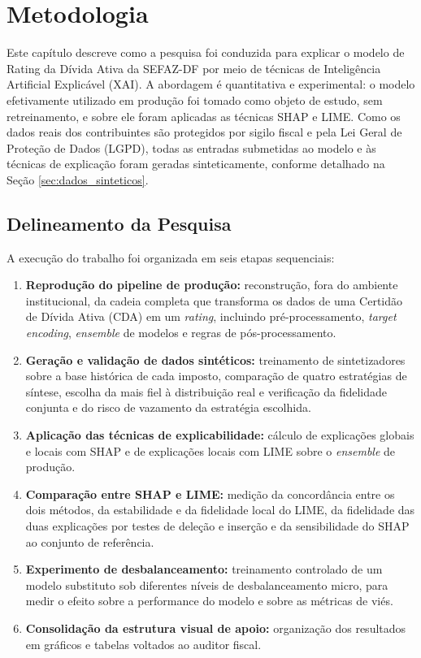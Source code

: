 \chapter{Metodologia}
\label{cap:metodologia}

Este capítulo descreve como a pesquisa foi conduzida para explicar o modelo de Rating da Dívida Ativa da SEFAZ-DF por meio de técnicas de Inteligência Artificial Explicável (XAI). A abordagem é quantitativa e experimental: o modelo efetivamente utilizado em produção foi tomado como objeto de estudo, sem retreinamento, e sobre ele foram aplicadas as técnicas SHAP e LIME. Como os dados reais dos contribuintes são protegidos por sigilo fiscal e pela Lei Geral de Proteção de Dados (LGPD), todas as entradas submetidas ao modelo e às técnicas de explicação foram geradas sinteticamente, conforme detalhado na Seção \ref{sec:dados_sinteticos}.

\section{Delineamento da Pesquisa}

A execução do trabalho foi organizada em seis etapas sequenciais:

\begin{enumerate}
    \item \textbf{Reprodução do pipeline de produção:} reconstrução, fora do ambiente institucional, da cadeia completa que transforma os dados de uma Certidão de Dívida Ativa (CDA) em um \textit{rating}, incluindo pré-processamento, \textit{target encoding}, \textit{ensemble} de modelos e regras de pós-processamento.
    \item \textbf{Geração e validação de dados sintéticos:} treinamento de sintetizadores sobre a base histórica de cada imposto, comparação de quatro estratégias de síntese, escolha da mais fiel à distribuição real e verificação da fidelidade conjunta e do risco de vazamento da estratégia escolhida.
    \item \textbf{Aplicação das técnicas de explicabilidade:} cálculo de explicações globais e locais com SHAP e de explicações locais com LIME sobre o \textit{ensemble} de produção.
    \item \textbf{Comparação entre SHAP e LIME:} medição da concordância entre os dois métodos, da estabilidade e da fidelidade local do LIME, da fidelidade das duas explicações por testes de deleção e inserção e da sensibilidade do SHAP ao conjunto de referência.
    \item \textbf{Experimento de desbalanceamento:} treinamento controlado de um modelo substituto sob diferentes níveis de desbalanceamento micro, para medir o efeito sobre a performance do modelo e sobre as métricas de viés.
    \item \textbf{Consolidação da estrutura visual de apoio:} organização dos resultados em gráficos e tabelas voltados ao auditor fiscal.
\end{enumerate}

